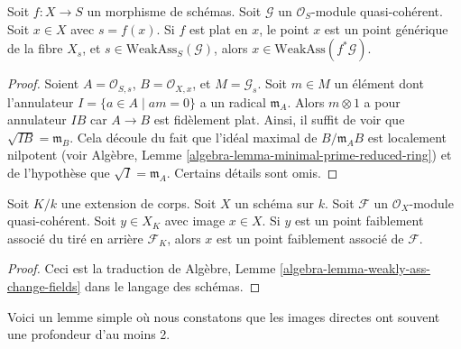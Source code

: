\begin{lemma}
\label{lemma-weakly-ass-pullback}
Soit  $f : X \to S$  un morphisme de schémas. Soit  $\mathcal{G}$  un
 $\mathcal{O}_S$-module quasi-cohérent. Soit  $x \in X$  avec  $s = f(x)$. Si
 $f$  est plat en  $x$, le point  $x$  est un point
générique de la fibre  $X_s$, et  $s \in \text{WeakAss}_S(\mathcal{G})$, alors  $x \in \text{WeakAss}(f^*\mathcal{G})$.
\end{lemma}

\begin{proof}
Soient  $A = \mathcal{O}_{S, s}$,  $B = \mathcal{O}_{X, x}$, et  $M = \mathcal{G}_s$. Soit  $m \in M$  un élément
dont l’annulateur  $I = \{a \in A \mid am = 0\}$  a un radical  $\mathfrak m_A$. Alors  $m \otimes 1$  a
pour annulateur  $I B$  car  $A \to B$  est fidèlement plat. Ainsi, il
suffit de voir que  $\sqrt{I B} = \mathfrak m_B$. Cela découle du fait que l'idéal maximal de
 $B/\mathfrak m_AB$  est localement nilpotent (voir Algèbre, Lemme  \ref{algebra-lemma-minimal-prime-reduced-ring}) et de
l’hypothèse que  $\sqrt{I} = \mathfrak m_A$. Certains détails sont omis.
\end{proof}

\begin{lemma}
\label{lemma-weakly-ass-change-fields}
Soit  $K/k$  une extension de corps. Soit  $X$  un schéma sur
 $k$. Soit  $\mathcal{F}$  un  $\mathcal{O}_X$-module quasi-cohérent. Soit
 $y \in X_K$  avec image  $x \in X$. Si  $y$  est un point faiblement
associé du tiré en arrière  $\mathcal{F}_K$, alors  $x$  est un point
faiblement associé de  $\mathcal{F}$.
\end{lemma}

\begin{proof}
Ceci est la traduction de Algèbre, Lemme  \ref{algebra-lemma-weakly-ass-change-fields}  dans le langage des schémas.
\end{proof}

\noindent
Voici un lemme simple où nous constatons que les images directes ont souvent une
profondeur d'au moins 2.

